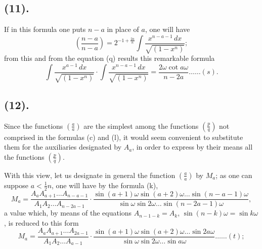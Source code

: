 \documentclass{article}
\begin{document}
\subsection*{(11).}

If in this formula one puts $n-a$ in place of $a$, one will have
\[ \left(\frac{n-a}{n-a}\right)=2^{-1+\frac{2a}{n}}\int\frac{x^{n-a-1}\,dx}{\sqrt{(1-x^{n})}}; \]
from this and from the equation (q) results this remarkable formula
\[ \int\frac{x^{a-1}\,dx}{\sqrt{(1-x^{n})}}\cdot\int\frac{x^{n-a-1}\,dx}{\sqrt{(1-x^{n})}}=\frac{2\omega\cot a\omega}{n-2a}\ldots\ldots(s). \]

\subsection*{(12).}

Since the functions $\left(\frac{a}{a}\right)$ are the simplest among the functions $\left(\frac{p}{q}\right)$ not comprised in the formulas (c) and (l), it would seem convenient to substitute them for the auxiliaries designated by $A_{a}$, in order to express by their means all the functions $\left(\frac{p}{q}\right)$.

With this view, let us designate in general the function $\left(\frac{a}{a}\right)$ by $M_{a}$; as one can suppose $a<\frac{1}{2}n$, one will have by the formula (k),
\[ M_{a}=\frac{A_{a}A_{a+1}\ldots A_{n-a-1}}{A_{1}A_{2}\ldots A_{n-2a-1}}\cdot\frac{\sin(a+1)\omega\sin(a+2)\omega\ldots\sin(n-a-1)\omega}{\sin\omega\sin 2\omega\ldots\sin(n-2a-1)\omega}, \]
a value which, by means of the equations $A_{n-1-k}=A_{k}$, $\sin(n-k)\omega=\sin k\omega$, is reduced to this form
\[ M_{a}=\frac{A_{a}A_{a+1}\ldots A_{2a-1}}{A_{1}A_{2}\ldots A_{a-1}}\cdot\frac{\sin(a+1)\omega\sin(a+2)\omega\ldots\sin 2a\omega}{\sin\omega\sin 2\omega\ldots\sin a\omega}\ldots\ldots(t); \]
\end{document}
